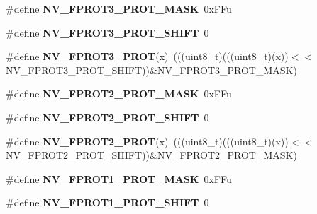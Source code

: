 \begin{DoxyCompactItemize}
\item 
\#define {\bfseries N\+V\+\_\+\+F\+P\+R\+O\+T3\+\_\+\+P\+R\+O\+T\+\_\+\+M\+A\+SK}~0x\+F\+Fu\hypertarget{group__NV__Register__Masks_ga1a2ecc3ba1f6ae4c2db7fcaa8f369b34}{}\label{group__NV__Register__Masks_ga1a2ecc3ba1f6ae4c2db7fcaa8f369b34}

\item 
\#define {\bfseries N\+V\+\_\+\+F\+P\+R\+O\+T3\+\_\+\+P\+R\+O\+T\+\_\+\+S\+H\+I\+FT}~0\hypertarget{group__NV__Register__Masks_gaee74e224c0572f7618f28c11d921b6e3}{}\label{group__NV__Register__Masks_gaee74e224c0572f7618f28c11d921b6e3}

\item 
\#define {\bfseries N\+V\+\_\+\+F\+P\+R\+O\+T3\+\_\+\+P\+R\+OT}(x)~(((uint8\+\_\+t)(((uint8\+\_\+t)(x))$<$$<$N\+V\+\_\+\+F\+P\+R\+O\+T3\+\_\+\+P\+R\+O\+T\+\_\+\+S\+H\+I\+FT))\&N\+V\+\_\+\+F\+P\+R\+O\+T3\+\_\+\+P\+R\+O\+T\+\_\+\+M\+A\+SK)\hypertarget{group__NV__Register__Masks_ga67cd7aad5307a5ee8de3a2dd16c6315c}{}\label{group__NV__Register__Masks_ga67cd7aad5307a5ee8de3a2dd16c6315c}

\item 
\#define {\bfseries N\+V\+\_\+\+F\+P\+R\+O\+T2\+\_\+\+P\+R\+O\+T\+\_\+\+M\+A\+SK}~0x\+F\+Fu\hypertarget{group__NV__Register__Masks_ga99b7ccf89e4d3cc80d0317086202de0f}{}\label{group__NV__Register__Masks_ga99b7ccf89e4d3cc80d0317086202de0f}

\item 
\#define {\bfseries N\+V\+\_\+\+F\+P\+R\+O\+T2\+\_\+\+P\+R\+O\+T\+\_\+\+S\+H\+I\+FT}~0\hypertarget{group__NV__Register__Masks_ga50f9336b86839704ca20297b040c3ca5}{}\label{group__NV__Register__Masks_ga50f9336b86839704ca20297b040c3ca5}

\item 
\#define {\bfseries N\+V\+\_\+\+F\+P\+R\+O\+T2\+\_\+\+P\+R\+OT}(x)~(((uint8\+\_\+t)(((uint8\+\_\+t)(x))$<$$<$N\+V\+\_\+\+F\+P\+R\+O\+T2\+\_\+\+P\+R\+O\+T\+\_\+\+S\+H\+I\+FT))\&N\+V\+\_\+\+F\+P\+R\+O\+T2\+\_\+\+P\+R\+O\+T\+\_\+\+M\+A\+SK)\hypertarget{group__NV__Register__Masks_ga3361ca8560d8cdf09a1efcc0b83950fe}{}\label{group__NV__Register__Masks_ga3361ca8560d8cdf09a1efcc0b83950fe}

\item 
\#define {\bfseries N\+V\+\_\+\+F\+P\+R\+O\+T1\+\_\+\+P\+R\+O\+T\+\_\+\+M\+A\+SK}~0x\+F\+Fu\hypertarget{group__NV__Register__Masks_ga4ca39bad3b57769cb423f1616c985e38}{}\label{group__NV__Register__Masks_ga4ca39bad3b57769cb423f1616c985e38}

\item 
\#define {\bfseries N\+V\+\_\+\+F\+P\+R\+O\+T1\+\_\+\+P\+R\+O\+T\+\_\+\+S\+H\+I\+FT}~0\hypertarget{group__NV__Register__Masks_ga06d0cb2797f243b77d60cfecedfc9f86}{}\label{group__NV__Register__Masks_ga06d0cb2797f243b77d60cfecedfc9f86}


\end{DoxyCompactItemize}
